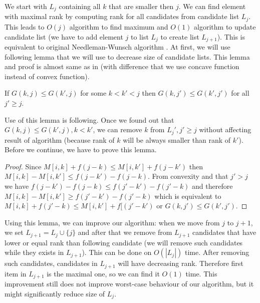 We start with $L_j$ containing all $k$ that are smaller then $j$.  We can find
element with maximal rank by computing rank for all candidates from candidate
list $L_j$. This leads to $O(j)$ algorithm to find maximum and $O(1)$ algorithm
to update candidate list (we have to add element $j$ to list $L_{j}$ to create
list $L_{j+1}$). This is equivalent to original Needleman-Wunsch algorithm
\cite{Needleman1970}. At first, we will use following lemma that we will use to
decrease size of candidate lists. This lemma and proof is almost same as in
\cite{GusfieldBook} (with difference that we use concave function instead of
convex function).

\begin{lemma}\label{OneStrikeAndOut}
If $G(k,j)\leq G(k',j)$ for some $k<k'<j$ then
$G(k,j')\leq G(k',j')$ for all $j'\geq j$. 
\end{lemma}

Use of this lemma is following. Once we found out that $G(k,j)\leq
G(k',j),k<k'$, we can remove $k$ from $L_j', j'\geq j$ without affecting result
of algorithm (because rank of $k$ will be always smaller than rank of $k'$).
Before we continue, we have to prove this lemma.

\begin{proof}

Since $M[i,k]+f(j-k)\leq M[i,k']+f(j-k')$ then 
$M[i,k]-M[i,k']\leq f(j-k')-f(j-k)$. From convexity and that $j'>j$ we have
$f(j-k')-f(j-k)\leq f(j'-k')-f(j'-k)$ and therefore
$M[i,k]-M[i,k']\geq f(j'-k')-f(j'-k)$ which 
is equivalent to
$M[i,k]+f(j'-k)\leq M[i,k']+f[(j'-k')$ or $G(k,j')\leq G(k',j')$.

\end{proof}

Using this lemma, we can improve our algorithm: 
when we move from $j$ to $j+1$, we set $L_{j+1}=L_{j}\cup\{j\}$ and after that
we remove from $L_{j+1}$ candidates that have lower or equal rank than following
candidate (we will remove such candidates while they exists in $L_{j+1}$).
This can be done on $O(|L_{j}|)$ time. After removing such candidates,
candidates in $L_{j+1}$ will have decreasing rank. Therefore first item in
$L_{j+1}$ is the maximal one, so we can find it $O(1)$ time.  This improvement
still does not improve worst-case behaviour of our algorithm, but it might
significantly reduce size of $L_j$. 

